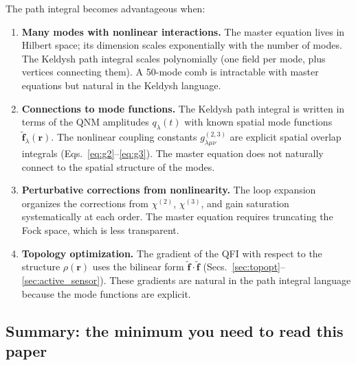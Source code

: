 \documentclass[12pt]{article}
\newcommand{\tf}{\tilde{\mathbf{f}}}
\begin{document}
The path integral becomes advantageous when:
\begin{enumerate}
  \item \textbf{Many modes with nonlinear interactions.}
    The master equation lives in Hilbert space; its dimension scales
    exponentially with the number of modes.  The Keldysh path integral
    scales polynomially (one field per mode, plus vertices connecting
    them).  A 50-mode comb is intractable with master equations but
    natural in the Keldysh language.

  \item \textbf{Connections to mode functions.}
    The Keldysh path integral is written in terms of the QNM amplitudes
    $q_\lambda(t)$ with known spatial mode functions $\tf_\lambda(\mathbf{r})$.
    The nonlinear coupling constants $g^{(2,3)}_{\lambda\mu\nu}$ are explicit
    spatial overlap integrals (Eqs.~\ref{eq:g2}--\ref{eq:g3}).
    The master equation does not naturally connect to the spatial
    structure of the modes.

  \item \textbf{Perturbative corrections from nonlinearity.}
    The loop expansion organizes the corrections from $\chi^{(2)}$,
    $\chi^{(3)}$, and gain saturation systematically at each order.
    The master equation requires truncating the Fock space, which is
    less transparent.

  \item \textbf{Topology optimization.}
    The gradient of the QFI with respect to the structure $\rho(\mathbf{r})$
    uses the bilinear form $\tf\cdot\tf$ (Secs.~\ref{sec:topopt}--\ref{sec:active_sensor}).
    These gradients are natural in the path integral language because the
    mode functions are explicit.
\end{enumerate}

\subsection{Summary: the minimum you need to read this paper}
\end{document}
